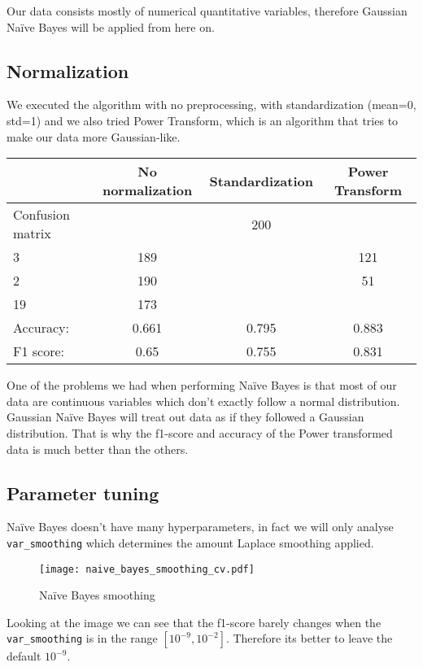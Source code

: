 Our data consists mostly of numerical quantitative variables, therefore Gaussian Na\"ive Bayes will be applied from here on.

\subsection{Normalization}

We executed the algorithm with no preprocessing, with standardization (mean=0, std=1) and we also tried Power Transform, which is an algorithm that tries to make our data more Gaussian-like.

\begin{table}[H]
\centering
\begin{tabular}{lccc}
\toprule
    & No normalization & Standardization & Power Transform \\
    \midrule
    Confusion matrix & 
    \( \begin{bmatrix} 208 & 200 \\ 3 & 189 \end{bmatrix} \) & 
    \( \begin{bmatrix} 287 & 121 \\ 2 & 190\end{bmatrix} \) &
    \( \begin{bmatrix} 357 & 51 \\ 19 & 173\end{bmatrix} \)
    \\
    \addlinespace[0.5em]
    Accuracy: & 0.661 & 0.795 & 0.883 \\
    F1 score: & 0.65 & 0.755 & 0.831 \\
    \bottomrule
\end{tabular}
\end{table}


One of the problems we had when performing Na\"ive Bayes is that most of our data are continuous variables
which don't exactly follow a normal distribution. Gaussian Na\"ive Bayes will treat out data as if they followed 
a Gaussian distribution. That is why the f1-score and accuracy of the Power transformed data is much better than the 
others.

\subsection{Parameter tuning}

Na\"ive Bayes doesn't have many hyperparameters, in fact we will only analyse \texttt{var\_smoothing} which determines the amount Laplace smoothing applied.

\begin{figure}[H]
    \centering
    \texttt{[image: naive\_bayes\_smoothing\_cv.pdf]}
    \caption{Na\"ive Bayes smoothing}%
    \label{fig:naive_bayes_smoothing_cv}
\end{figure}

Looking at the image we can see that the f1-score barely changes when the \texttt{var\_smoothing} is in the range $[10^{-9}, 10^{-2}]$. Therefore its better to leave the default $10^{-9}$.
